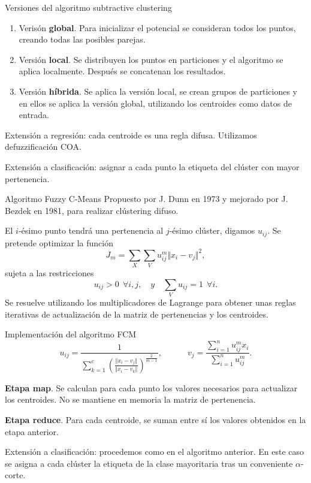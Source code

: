 \documentclass[10pt, spanish]{beamer}
\begin{document}
\begin{frame}{Versiones del algoritmo subtractive clustering}
  \begin{enumerate}
    \item Verisón \textbf{global}. Para inicializar el potencial se consideran todos los puntos, creando todas las posibles parejas.
    \item Versión \textbf{local}. Se distribuyen los puntos en particiones y el algoritmo se aplica localmente. Después se concatenan los resultados.
    \item Versión \textbf{híbrida}. Se aplica la versión local, se crean grupos de particiones y en ellos se aplica la versión global, utilizando los centroides como datos de entrada.
  \end{enumerate}

  \pause

  Extensión a regresión: cada centroide es una regla difusa. Utilizamos defuzzificación COA.

  Extensión a clasificación: asignar a cada punto la etiqueta del clúster con mayor pertenencia.
\end{frame}

\begin{frame}{Algoritmo Fuzzy C-Means}
  Propuesto por J. Dunn en 1973 y mejorado por J. Bezdek en 1981, para realizar clústering difuso.

  El $i$-ésimo punto tendrá una pertenencia al $j$-ésimo clúster, digamos $u_{ij}$. Se pretende optimizar la función
  \[
    J_m = \sum_{X}\sum_{V} u_{ij}^m\Vert x_i - v_j \Vert^2,
  \]
  sujeta a las restricciones
  \[
    u_{ij}>0 \ \ \forall i, j, \quad y \quad \sum_{V}u_{ij} =1 \ \ \forall i.
  \]
  Se resuelve utilizando los multiplicadores de Lagrange para obtener unas reglas iterativas de actualización de la matriz de pertenencias y los centroides.
\end{frame}

\begin{frame}{Implementación del algoritmo FCM}
  \[
u_{ij}= \dfrac{1}{\displaystyle \sum_{k=1}^c \left( \frac{\Vert x_i - v_j \Vert}{\Vert x_i - v_k \Vert} \right)^{\frac{2}{m-1}}}, \quad \quad \quad v_j = \dfrac{\displaystyle\sum_{i=1}^n u_{ij}^m x_i}{\displaystyle\sum_{i=1}^n u_{ij}^m}.
  \]
  \vspace{.5em}

  \textbf{Etapa map}. Se calculan para cada punto los valores necesarios para actualizar los centroides. No se mantiene en memoria la matriz de pertenencia.

  \textbf{Etapa reduce}. Para cada centroide, se suman entre sí los valores obtenidos en la etapa anterior.

  Extensión a clasificación: procedemos como en el algoritmo anterior. En este caso se asigna a cada clúster la etiqueta de la clase mayoritaria tras un conveniente $\alpha$-corte.
\end{frame}
\end{document}
